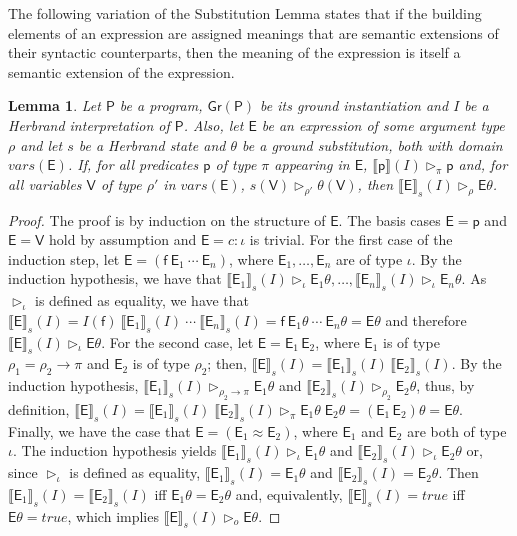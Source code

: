 \documentclass[submission,copyright]{eptcs}
\newtheorem{lemma}{Lemma}
\theoremstyle{definition}
\newcommand{\mwrt}[2]{\llbracket#1\rrbracket(#2)}
\newcommand{\mwrs}[3]{\llbracket#1\rrbracket_{#3}(#2)}
\newcommand{\ee}[1][I]{\rhd_{#1}}
\begin{document}
{The following variation of the Substitution Lemma states that if the building elements of an expression are assigned meanings that are semantic extensions of their syntactic counterparts, then the meaning of the expression is itself a semantic extension of the expression.}
\begin{lemma} \label{lm_state_substitution_extension}
Let $\mathsf{P}$ be a program, $\mathsf{Gr(P)}$ be its ground instantiation and $I$ be a Herbrand
interpretation of $\mathsf{P}$. Also, let $\mathsf{E}$ be an expression
of some argument type $\rho$ and
let $s$ be a Herbrand state and $\theta$ be a ground substitution, both with domain $vars(\mathsf{E})$.
If, for all predicates $\mathsf{p}$ of type $\pi$ appearing in $\mathsf{E}$, $\mwrt{\mathsf{p}}{I} \ee[\pi] \mathsf{p}$
and, for all variables $\mathsf{V}$ of type $\rho'$ in $vars(\mathsf{E})$, $s(\mathsf{V}) \ee[\rho'] \theta(\mathsf{V})$, then
$\mwrs{\mathsf{E}}{I}{s} \ee[\rho] \mathsf{E}\theta$.
\end{lemma}
\begin{proof}
The proof is by induction on the structure of $\mathsf{E}$.
The basis cases $\mathsf{E} = \mathsf{p}$ and $\mathsf{E} = \mathsf{V}$
hold by assumption and $\mathsf{E} = c:\iota$ is trivial.
For the first case of the induction step, let $\mathsf{E} =
(\mathsf{f}\ \mathsf{E}_1 \ \cdots \  \mathsf{E}_n)$,
where $\mathsf{E}_1,\ldots, \mathsf{E}_n$ are of type
$\iota$. By the induction hypothesis, we have that
$\mwrs{\mathsf{E}_1}{I}{s} \ee[\iota] \mathsf{E}_1\theta, \ldots, \mwrs{\mathsf{E}_n}{I}{s} \ee[\iota] \mathsf{E}_n\theta$.
As $\ee[\iota]$ is defined as equality, we have that $\mwrs{\mathsf{E}}{I}{s} = I(\mathsf{f})\ \mwrs{\mathsf{E}_1}{I}{s}\ \cdots \ \mwrs{\mathsf{E}_n}{I}{s} = \mathsf{f}\ \mathsf{E}_1\theta\ \cdots \ \mathsf{E}_n\theta = \mathsf{E}\theta$ and therefore $\mwrs{\mathsf{E}}{I}{s} \ee[\iota] \mathsf{E}\theta$.
For the second case, let $\mathsf{E} = \mathsf{E}_1 \, \mathsf{E}_2$,
where $\mathsf{E}_1$ is of type $\rho_1 = \rho_2\rightarrow \pi$ and $\mathsf{E}_2$ is of type $\rho_2$; then, $\mwrs{\mathsf{E}}{I}{s} = \mwrs{\mathsf{E}_1}{I}{s}\, \mwrs{\mathsf{E}_2}{I}{s}$.
By the induction hypothesis, $\mwrs{\mathsf{E}_1}{I}{s} \ee[\rho_2\rightarrow \pi] \mathsf{E}_1\theta$
and $\mwrs{\mathsf{E}_2}{I}{s} \ee[\rho_2] \mathsf{E}_2\theta$,
thus, by definition, $\mwrs{\mathsf{E}}{I}{s}=\mwrs{\mathsf{E}_1}{I}{s}\;\mwrs{\mathsf{E}_2}{I}{s} \ee[\pi] \mathsf{E}_1\theta \; \mathsf{E}_2\theta = (\mathsf{E}_1 \, \mathsf{E}_2)\theta=\mathsf{E}\theta$.
Finally, we have the case that $\mathsf{E} = (\mathsf{E}_1 \approx \mathsf{E}_2)$, where $\mathsf{E}_1$ and $\mathsf{E}_2$ are both of type $\iota$. The induction hypothesis yields $\mwrs{\mathsf{E}_1}{I}{s} \ee[\iota] \mathsf{E}_1\theta$ and $\mwrs{\mathsf{E}_2}{I}{s} \ee[\iota] \mathsf{E}_2\theta$ or, since $\ee[\iota]$ is defined as equality, $\mwrs{\mathsf{E}_1}{I}{s} = \mathsf{E}_1\theta$ and $\mwrs{\mathsf{E}_2}{I}{s} = \mathsf{E}_2\theta$. Then  $\mwrs{\mathsf{E}_1}{I}{s} = \mwrs{\mathsf{E}_2}{I}{s}$ iff  $\mathsf{E}_1\theta = \mathsf{E}_2\theta$ and, equivalently, $\mwrs{\mathsf{E}}{I}{s} = true$ iff $\mathsf{E}\theta = true$, which implies $\mwrs{\mathsf{E}}{I}{s} \ee[o] \mathsf{E}\theta$.
\end{proof}
\end{document}
